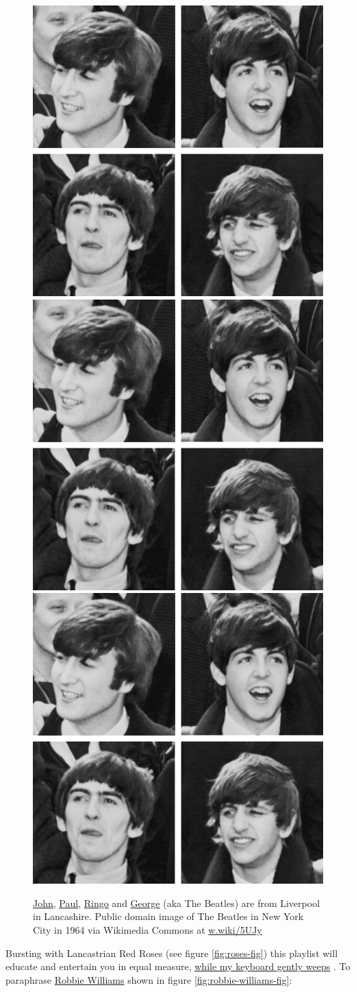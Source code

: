 \documentclass[
]{book}
\begin{document}
\begin{figure}
\includegraphics[width=0.33\linewidth]{images/the-beatles} \includegraphics[width=0.33\linewidth]{images/the-beatles} \includegraphics[width=0.33\linewidth]{images/the-beatles} \caption{\href{https://en.wikipedia.org/wiki/John_Lennon}{John}, \href{https://en.wikipedia.org/wiki/Paul_McCartney}{Paul}, \href{https://en.wikipedia.org/wiki/Ringo_Starr}{Ringo} and \href{https://en.wikipedia.org/wiki/George_Harrison}{George} (aka The Beatles) are from Liverpool in Lancashire. Public domain image of The Beatles in New York City in 1964 via Wikimedia Commons at \href{https://w.wiki/5UJy}{w.wiki/5UJy}}\label{fig:the-beatles-fig}
\end{figure}



Bursting with Lancastrian Red Roses (see figure \ref{fig:roses-fig}) this playlist will educate and entertain you in equal measure, \href{https://en.wikipedia.org/wiki/While_My_Guitar_Gently_Weeps}{while my keyboard gently weeps} \citep{weeps}. To paraphrase \href{https://en.wikipedia.org/wiki/Robbie_Williams}{Robbie Williams} shown in figure \ref{fig:robbie-williams-fig}:
\end{document}

